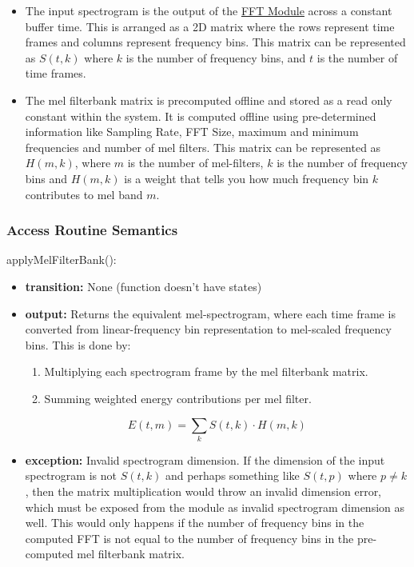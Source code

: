\documentclass[12pt, titlepage]{article}
\begin{document}
\begin{itemize}
  \item The input spectrogram is the output of the \hyperref[MG-mFFT]{FFT
  Module} across a constant buffer time. This is arranged as a 2D matrix where
  the rows represent time frames and columns represent frequency bins. This
  matrix can be represented as $S(t, k)$ where $k$ is the number of frequency
  bins, and $t$ is the number of time frames. 
  \item The mel filterbank matrix is precomputed offline and stored as a read
  only constant within the system. It is computed offline using pre-determined
  information like Sampling Rate, FFT Size, maximum and minimum frequencies and
  number of mel filters. This matrix can be represented as $H(m,k)$, where $m$
  is the number of mel-filters, $k$ is the number of frequency bins and $H(m,k)$
  is a weight that tells you how much frequency bin $k$ contributes to mel band
  $m$.
\end{itemize}

\subsubsection{Access Routine Semantics}

\noindent applyMelFilterBank():
\begin{itemize}
\item \textbf{transition:} None (function doesn't have states)
\item \textbf{output:} Returns the equivalent mel-spectrogram, where each time
  frame is converted from linear-frequency bin representation to mel-scaled
  frequency bins. This is done by:
  \begin{enumerate}
    \item Multiplying each spectrogram frame by the mel filterbank matrix. 
    \item Summing weighted energy contributions per mel filter. 
  \end{enumerate}
    \[
    E(t, m) = \sum_{k} S(t, k) \cdot H(m, k)
    \]
\item \textbf{exception:} Invalid spectrogram dimension. If the dimension of the
  input spectrogram is not $S(t,k)$ and perhaps something like $S(t,p)$ where $p
  \neq k$, then the matrix multiplication would throw an invalid dimension
  error, which must be exposed from the module as invalid spectrogram dimension
  as well. This would only happens if the number of frequency bins in the
  computed FFT is not equal to the number of frequency bins in the pre-computed
  mel filterbank matrix. 
\end{itemize}
\end{document}
